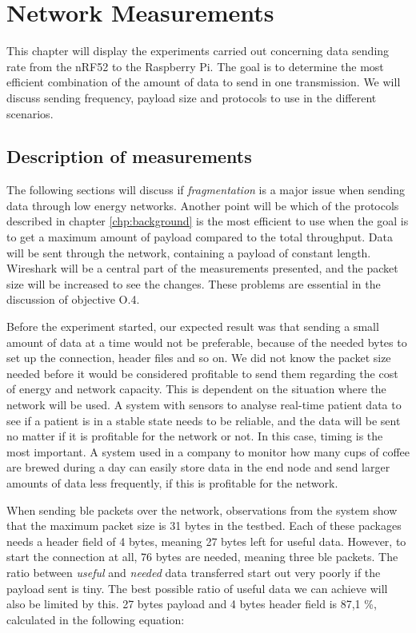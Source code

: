 \chapter{Network Measurements}
\label{chp:measurements2}


\noindent This chapter will display the experiments carried out concerning data sending rate from the \gls{nRF52} to the \gls{Raspberry Pi}. The goal is to determine the most efficient combination of the amount of data to send in one transmission. We will discuss sending frequency, \gls{payload} size and protocols to use in the different scenarios. 

\section{Description of measurements}

\noindent The following sections will discuss if \textit{fragmentation} is a major issue when sending data through low energy networks. Another point will be which of the protocols described in chapter \ref{chp:background} is the most efficient to use when the goal is to get a maximum amount of \gls{payload} compared to the total throughput. Data will be sent through the network, containing a payload of constant length. Wireshark will be a central part of the measurements presented, and the packet size will be increased to see the changes. These problems are essential in the discussion of objective O.4. 

\noindent Before the experiment started, our expected result was that sending a small amount of data at a time would not be preferable, because of the needed bytes to set up the connection, header files and so on. We did not know the packet size needed before it would be considered profitable to send them regarding the cost of energy and network capacity. This is dependent on the situation where the network will be used. A system with sensors to analyse real-time patient data to see if a patient is in a stable state needs to be reliable, and the data will be sent no matter if it is profitable for the network or not. In this case, timing is the most important. A system used in a company to monitor how many cups of coffee are brewed during a day can easily store data in the end node and send larger amounts of data less frequently, if this is profitable for the network. 

\noindent When sending \gls{ble} packets over the network, observations from the system show that the maximum packet size is 31 bytes in the testbed. Each of these packages needs a header field of 4 bytes, meaning 27 bytes left for useful data. However, to start the connection at all, 76 bytes are needed, meaning three \gls{ble} packets. The ratio between \textit{useful} and \textit{needed} data transferred start out very poorly if the payload sent is tiny. The best possible ratio of useful data we can achieve will also be limited by this. 27 bytes \gls{payload} and 4 bytes header field is 87,1 \%, calculated in the following equation: 

